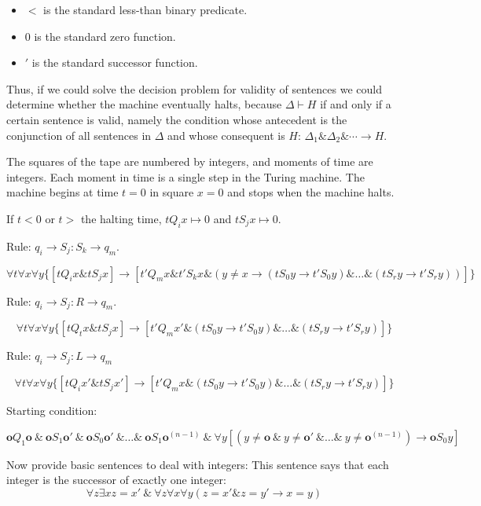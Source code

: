 \documentclass{article}
\theoremstyle{definition}
\theoremstyle{definition}
\begin{document}
\begin{enumerate}
\begin{itemize}
\item $<$ is the standard less-than binary predicate.

\item $0$ is the standard zero function.

\item $'$ is the standard successor function.

\end{itemize}

Thus, if we could solve the decision problem for validity of sentences we could determine whether the machine eventually halts, because $\Delta\vdash H$ if and only if a certain sentence is valid, namely the condition whose antecedent is the conjunction of all sentences in $\Delta$ and whose consequent is $H$: $\Delta_1 \& \Delta_2 \& \cdots \rightarrow H$.

The squares of the tape are numbered by integers, and moments of time are integers. Each moment in time is a single step in the Turing machine. The machine begins at time $t=0$ in square $x=0$ and stops when the machine halts. 

If $t<0$ or $t>$ the halting time, $tQ_ix \mapsto 0$ and $tS_jx\mapsto 0$.

Rule: $q_i \rightarrow S_j:S_k \rightarrow q_m$.

\[\forall t\forall x\forall y \{[tQ_ix\& tS_jx] \rightarrow [t'Q_mx\& t'S_kx \& (y\ne x \rightarrow (tS_0y\rightarrow t'S_0y)\&\dots\&(tS_ry\rightarrow t'S_ry))]\}\]

Rule: $q_i\rightarrow S_j:R\rightarrow q_m$.

\[\forall t\forall x\forall y\{[tQ_tx\&tS_jx]\rightarrow [t'Q_mx' \& (tS_0y\rightarrow t'S_0y)\&\dots\&(tS_ry\rightarrow t'S_ry)]\}\]

Rule: $q_i\rightarrow S_j:L \rightarrow q_m$

\[\forall t \forall x \forall y \{[tQ_ix' \& tS_jx']\rightarrow [t'Q_mx\& (tS_0y\rightarrow t'S_0y)\&\dots\&(tS_ry\rightarrow t'S_ry)]\}\]

Starting condition:

\newcommand{\z}{\mathbf{o}}

\[\z Q_1 \z\ \&\ \z S_1\z'\ \&\ \z S_0\z '\ \&\dots\&\ \z S_1\z^{(n-1)}\ \&\ \forall y [(y\ne \z\ \&\ y\ne \z'\ \&\dots\&\ y\ne \z^{(n-1)}) \rightarrow \z S_0y]\]

Now provide basic sentences to deal with integers:
This sentence says that each integer is the successor of exactly one integer:
\[\forall z\exists x z = x'\ \& \ \forall z\forall x\forall y (z=x'\&z=y'\rightarrow x=y)\]


\end{enumerate}
\end{document}
